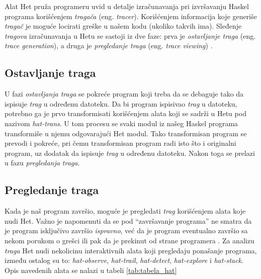\documentclass[a4paper]{article}
\begin{document}
Alat Het pruža programeru uvid u detalje izračunavanja pri izvršavanju Haskel programa korišćenjem {\em tragača} (eng. {\em tracer}). 
Korišćenjem informacija koje generiše {\em tragač} je moguće locirati greške u našem kodu (ukoliko takvih ima).
Sleđenje {\em tragova} izračunavanja u Hetu se sastoji iz dve faze: prva je {\em ostavljanje traga} (eng. {\em trace generation}), a druga je {\em pregledanje traga} (eng. {\em trace viewing}) \cite{chitil2002transforming}.

\subsection{Ostavljanje traga}
U fazi {\em ostavljanja traga} se pokreće program koji treba da se debaguje tako da ispisuje {\em trag} u određenu datoteku. Da bi program ispisivao {\em trag} u datoteku,
potrebno ga je prvo transformisati korišćenjem alata koji se sadrži u Hetu pod nazivom {\em hat-trans}. U tom procesu se svaki modul iz našeg Haskel programa transformiše 
u njemu odgovarajući Het modul. Tako transformisan program se prevodi i pokreće,
pri čemu transformisan program radi isto što i originalni program, uz dodatak da ispisuje {\em trag} u određenu datoteku. Nakon toga se prelazi u fazu {\em pregledanja traga}.

\subsection{Pregledanje traga}
Kada je naš program završio, moguće je pregledati {\em trag} korišćenjem alata koje nudi Het. Važno je napomenuti da se pod ``završavanje programa'' ne smatra 
da je program isključivo završio {\em ispravno}, već da je program eventualno završio sa nekom porukom o grešci ili pak da je prekinut od strane programera \cite{hat_haskell_org}.
Za analizu {\em traga} Het nudi nekolicinu interaktivnih alata koji pregledaju ponašanje programa, 
između ostalog su to: {\em hat-observe}, {\em hat-trail}, {\em hat-detect}, {\em hat-explore} i {\em hat-stack}. Opis navedenih alata se nalazi u tabeli \ref{tab:tabela_hat}
\end{document}
